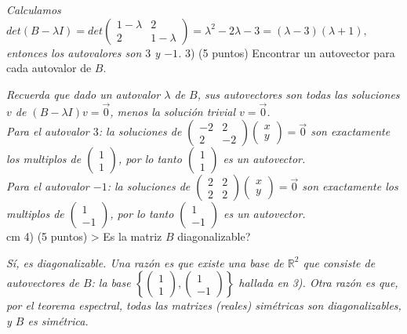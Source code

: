 \documentclass[12pt,a4paper]{amsart}
\newcommand{\RR}{\mathbb{R}} %
\begin{document}
\vskip 0.5cm
\emph{
Calculamos $det(B-\lambda I)=det\left(\begin{array}{cc}1-\lambda & 2 \\2 & 1-\lambda\end{array}\right)=\lambda^2-2\lambda-3=(\lambda-3)(\lambda+1),$
entonces los autovalores son $3$ y $-1$.
}
\vskip 3cm
3)  (5 puntos) Encontrar un autovector para cada autovalor de $B$.

\vskip 0.5cm
\emph{
Recuerda que dado un autovalor $\lambda$ de $B$, sus autovectores 
son   todas las soluciones $v$ de $(B-\lambda I)v=\vec{0}$, menos la soluci\'on trivial $v=\vec{0}$.\\
Para el autovalor $3$:  la soluciones 
de
$\left(\begin{array}{cc}-2 & 2 \\2 & -2\end{array}\right)
\left(\begin{array}{c} x\\  y    \end{array}\right)=\vec{0}$
son exactamente los multiplos de 
$\left(\begin{array}{c} 1\\ 1    \end{array}\right)$, por lo tanto
$
\left(\begin{array}{c} 1\\ 1    \end{array}\right)$ es un autovector.\\
Para el autovalor $-1$:  la soluciones 
de
$\left(\begin{array}{cc}2 & 2 \\2 & 2\end{array}\right)
\left(\begin{array}{c} x\\  y    \end{array}\right)=\vec{0}$
son exactamente los multiplos de 
$\left(\begin{array}{c} 1\\ -1    \end{array}\right)$, por lo tanto
$
\left(\begin{array}{c} 1\\ -1    \end{array}\right)$ es un autovector.\\
}
 cm
4)  (5 puntos) > Es la matriz $B$ diagonalizable?

\vskip 0.5cm
\emph{S\'i, es diagonalizable. Una raz\'on es que existe una base de $\RR^2$ que consiste de autovectores de $B$: la base $\left\{
\left(\begin{array}{c} 1\\ 1    \end{array}\right),
\left(\begin{array}{c} 1\\ -1    \end{array}\right)\right\}$
hallada en 3). Otra raz\'on es que, por el teorema espectral, todas las matrizes (reales) sim\'etricas son diagonalizables, y $B$ es sim\'etrica.
}
\end{document}
